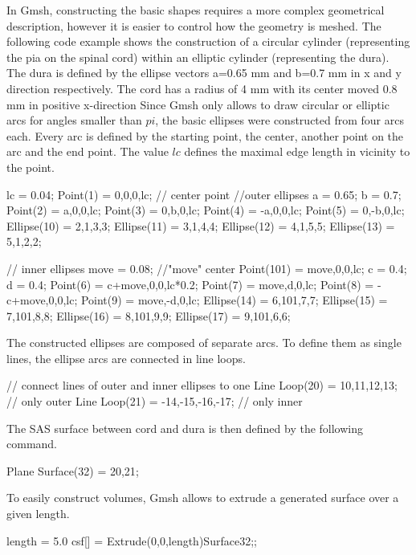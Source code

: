 In Gmsh, constructing the basic shapes requires a more complex geometrical description, however it is easier to control how the geometry is meshed. The following code example shows the construction of a circular cylinder (representing the pia on the spinal cord) within an elliptic cylinder (representing the dura). The dura is defined by the ellipse vectors a=0.65 mm and b=0.7 mm in x and y direction respectively. The cord has a radius of 4 mm with its center moved 0.8 mm in positive x-direction  Since Gmsh only allows to draw circular or elliptic arcs for angles smaller than $pi$, the basic ellipses were constructed from four arcs each. Every arc is defined by the starting point, the center, another point on the arc and the end point. The value $lc$  defines the maximal edge length in vicinity to the point.

\begin{code}
lc = 0.04;
Point(1) = {0,0,0,lc};	// center point
//outer ellipses
a = 0.65;
b = 0.7;
Point(2) = {a,0,0,lc};	
Point(3) = {0,b,0,lc};	
Point(4) = {-a,0,0,lc};
Point(5) = {0,-b,0,lc};
Ellipse(10) = {2,1,3,3};
Ellipse(11) = {3,1,4,4};
Ellipse(12) = {4,1,5,5};
Ellipse(13) = {5,1,2,2};

// inner ellipses
move = 0.08; //"move" center
Point(101) = {move,0,0,lc};
c = 0.4;
d = 0.4;
Point(6) = {c+move,0,0,lc*0.2};
Point(7) = {move,d,0,lc};
Point(8) = {-c+move,0,0,lc};
Point(9) = {move,-d,0,lc};
Ellipse(14) = {6,101,7,7};
Ellipse(15) = {7,101,8,8};
Ellipse(16) = {8,101,9,9};
Ellipse(17) = {9,101,6,6};
\end{code}

The constructed ellipses are composed of separate arcs. To define them as single lines, the ellipse arcs are connected in line loops. 

\begin{code}
// connect lines of outer and inner ellipses to one
Line Loop(20) = {10,11,12,13};		// only outer
Line Loop(21) = {-14,-15,-16,-17};	// only inner
\end{code}
The SAS surface between cord and dura is then defined by the following command.
\begin{code}
Plane Surface(32) = {20,21};
\end{code}

To easily construct volumes, Gmsh allows to extrude a generated surface over a given length. 
\begin{code}
length = 5.0
csf[] = Extrude(0,0,length){Surface{32};};
\end{code}


